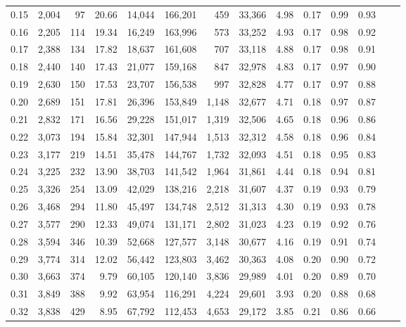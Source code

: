 \begin{tabular}{rrrrrrrrrrrrrr}
0.15 &  2,004 &   97 &   20.66 &   14,044 &  166,201 &     459 &  33,366 &  4.98 &  0.17 &  0.99 &      0.93 \\
0.16 &  2,205 &  114 &   19.34 &   16,249 &  163,996 &     573 &  33,252 &  4.93 &  0.17 &  0.98 &      0.92 \\
0.17 &  2,388 &  134 &   17.82 &   18,637 &  161,608 &     707 &  33,118 &  4.88 &  0.17 &  0.98 &      0.91 \\
0.18 &  2,440 &  140 &   17.43 &   21,077 &  159,168 &     847 &  32,978 &  4.83 &  0.17 &  0.97 &      0.90 \\
0.19 &  2,630 &  150 &   17.53 &   23,707 &  156,538 &     997 &  32,828 &  4.77 &  0.17 &  0.97 &      0.88 \\
0.20 &  2,689 &  151 &   17.81 &   26,396 &  153,849 &   1,148 &  32,677 &  4.71 &  0.18 &  0.97 &      0.87 \\
0.21 &  2,832 &  171 &   16.56 &   29,228 &  151,017 &   1,319 &  32,506 &  4.65 &  0.18 &  0.96 &      0.86 \\
0.22 &  3,073 &  194 &   15.84 &   32,301 &  147,944 &   1,513 &  32,312 &  4.58 &  0.18 &  0.96 &      0.84 \\
0.23 &  3,177 &  219 &   14.51 &   35,478 &  144,767 &   1,732 &  32,093 &  4.51 &  0.18 &  0.95 &      0.83 \\
0.24 &  3,225 &  232 &   13.90 &   38,703 &  141,542 &   1,964 &  31,861 &  4.44 &  0.18 &  0.94 &      0.81 \\
0.25 &  3,326 &  254 &   13.09 &   42,029 &  138,216 &   2,218 &  31,607 &  4.37 &  0.19 &  0.93 &      0.79 \\
0.26 &  3,468 &  294 &   11.80 &   45,497 &  134,748 &   2,512 &  31,313 &  4.30 &  0.19 &  0.93 &      0.78 \\
0.27 &  3,577 &  290 &   12.33 &   49,074 &  131,171 &   2,802 &  31,023 &  4.23 &  0.19 &  0.92 &      0.76 \\
0.28 &  3,594 &  346 &   10.39 &   52,668 &  127,577 &   3,148 &  30,677 &  4.16 &  0.19 &  0.91 &      0.74 \\
0.29 &  3,774 &  314 &   12.02 &   56,442 &  123,803 &   3,462 &  30,363 &  4.08 &  0.20 &  0.90 &      0.72 \\
0.30 &  3,663 &  374 &    9.79 &   60,105 &  120,140 &   3,836 &  29,989 &  4.01 &  0.20 &  0.89 &      0.70 \\
0.31 &  3,849 &  388 &    9.92 &   63,954 &  116,291 &   4,224 &  29,601 &  3.93 &  0.20 &  0.88 &      0.68 \\
0.32 &  3,838 &  429 &    8.95 &   67,792 &  112,453 &   4,653 &  29,172 &  3.85 &  0.21 &  0.86 &      0.66 \\

\end{tabular}
